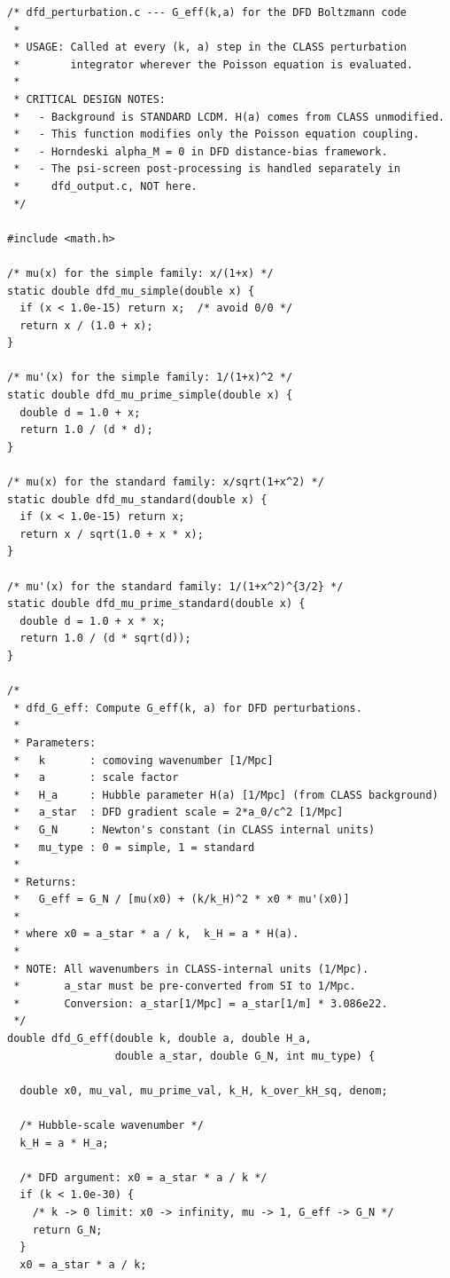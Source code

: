 \documentclass[11pt]{article}
\theoremstyle{definition}
\theoremstyle{remark}
\begin{document}
\begin{lstlisting}[caption={Complete \texttt{dfd\_G\_eff()} function in C},
  label={lst:geff}]
/* dfd_perturbation.c --- G_eff(k,a) for the DFD Boltzmann code
 *
 * USAGE: Called at every (k, a) step in the CLASS perturbation
 *        integrator wherever the Poisson equation is evaluated.
 *
 * CRITICAL DESIGN NOTES:
 *   - Background is STANDARD LCDM. H(a) comes from CLASS unmodified.
 *   - This function modifies only the Poisson equation coupling.
 *   - Horndeski alpha_M = 0 in DFD distance-bias framework.
 *   - The psi-screen post-processing is handled separately in
 *     dfd_output.c, NOT here.
 */

#include <math.h>

/* mu(x) for the simple family: x/(1+x) */
static double dfd_mu_simple(double x) {
  if (x < 1.0e-15) return x;  /* avoid 0/0 */
  return x / (1.0 + x);
}

/* mu'(x) for the simple family: 1/(1+x)^2 */
static double dfd_mu_prime_simple(double x) {
  double d = 1.0 + x;
  return 1.0 / (d * d);
}

/* mu(x) for the standard family: x/sqrt(1+x^2) */
static double dfd_mu_standard(double x) {
  if (x < 1.0e-15) return x;
  return x / sqrt(1.0 + x * x);
}

/* mu'(x) for the standard family: 1/(1+x^2)^{3/2} */
static double dfd_mu_prime_standard(double x) {
  double d = 1.0 + x * x;
  return 1.0 / (d * sqrt(d));
}

/*
 * dfd_G_eff: Compute G_eff(k, a) for DFD perturbations.
 *
 * Parameters:
 *   k       : comoving wavenumber [1/Mpc]
 *   a       : scale factor
 *   H_a     : Hubble parameter H(a) [1/Mpc] (from CLASS background)
 *   a_star  : DFD gradient scale = 2*a_0/c^2 [1/Mpc]
 *   G_N     : Newton's constant (in CLASS internal units)
 *   mu_type : 0 = simple, 1 = standard
 *
 * Returns:
 *   G_eff = G_N / [mu(x0) + (k/k_H)^2 * x0 * mu'(x0)]
 *
 * where x0 = a_star * a / k,  k_H = a * H(a).
 *
 * NOTE: All wavenumbers in CLASS-internal units (1/Mpc).
 *       a_star must be pre-converted from SI to 1/Mpc.
 *       Conversion: a_star[1/Mpc] = a_star[1/m] * 3.086e22.
 */
double dfd_G_eff(double k, double a, double H_a,
                 double a_star, double G_N, int mu_type) {

  double x0, mu_val, mu_prime_val, k_H, k_over_kH_sq, denom;

  /* Hubble-scale wavenumber */
  k_H = a * H_a;

  /* DFD argument: x0 = a_star * a / k */
  if (k < 1.0e-30) {
    /* k -> 0 limit: x0 -> infinity, mu -> 1, G_eff -> G_N */
    return G_N;
  }
  x0 = a_star * a / k;


\end{lstlisting}
\end{document}
